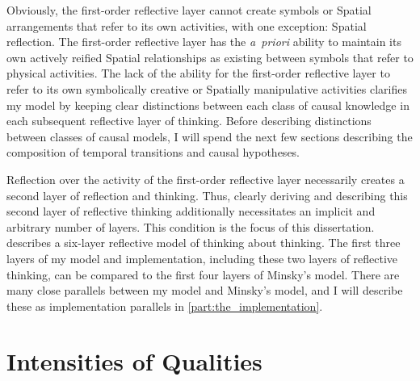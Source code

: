 Obviously, the first-order reflective layer cannot create symbols or
Spatial arrangements that refer to its own activities, with one
exception: Spatial reflection.  The first-order reflective layer has
the \emph{a~priori} ability to maintain its own actively reified
Spatial relationships as existing between symbols that refer to
physical activities.  The lack of the ability for the first-order
reflective layer to refer to its own symbolically creative or
Spatially manipulative activities clarifies my model by keeping clear
distinctions between each class of causal knowledge in each subsequent
reflective layer of thinking.  Before describing distinctions between
classes of causal models, I will spend the next few sections
describing the composition of temporal transitions and causal
hypotheses.

Reflection over the activity of the first-order reflective layer
necessarily creates a second layer of reflection and thinking.  Thus,
clearly deriving and describing this second layer of reflective
thinking additionally necessitates an implicit and arbitrary number of
layers.  This condition is the focus of this dissertation.
\cite{minsky:2006} describes a six-layer reflective model of thinking
about thinking.  The first three layers of my model and
implementation, including these two layers of reflective thinking, can
be compared to the first four layers of Minsky's model.  There are
many close parallels between my model and Minsky's model, and I will
describe these as implementation parallels in
\autoref{part:the_implementation}.

\section{Intensities of Qualities}
\label{section:intensities_of_qualities}

